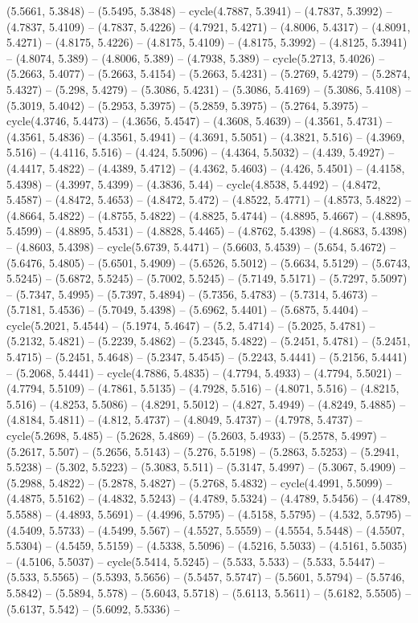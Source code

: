 (5.5661, 5.3848) -- (5.5495, 5.3848) -- cycle(4.7887, 5.3941) -- (4.7837, 5.3992) -- (4.7837, 5.4109) -- (4.7837, 5.4226) -- (4.7921, 5.4271) -- (4.8006, 5.4317) -- (4.8091, 5.4271) -- (4.8175, 5.4226) -- (4.8175, 5.4109) -- (4.8175, 5.3992) -- (4.8125, 5.3941) -- (4.8074, 5.389) -- (4.8006, 5.389) -- (4.7938, 5.389) -- cycle(5.2713, 5.4026) -- (5.2663, 5.4077) -- (5.2663, 5.4154) -- (5.2663, 5.4231) -- (5.2769, 5.4279) -- (5.2874, 5.4327) -- (5.298, 5.4279) -- (5.3086, 5.4231) -- (5.3086, 5.4169) -- (5.3086, 5.4108) -- (5.3019, 5.4042) -- (5.2953, 5.3975) -- (5.2859, 5.3975) -- (5.2764, 5.3975) -- cycle(4.3746, 5.4473) -- (4.3656, 5.4547) -- (4.3608, 5.4639) -- (4.3561, 5.4731) -- (4.3561, 5.4836) -- (4.3561, 5.4941) -- (4.3691, 5.5051) -- (4.3821, 5.516) -- (4.3969, 5.516) -- (4.4116, 5.516) -- (4.424, 5.5096) -- (4.4364, 5.5032) -- (4.439, 5.4927) -- (4.4417, 5.4822) -- (4.4389, 5.4712) -- (4.4362, 5.4603) -- (4.426, 5.4501) -- (4.4158, 5.4398) -- (4.3997, 5.4399) -- (4.3836, 5.44) -- cycle(4.8538, 5.4492) -- (4.8472, 5.4587) -- (4.8472, 5.4653) -- (4.8472, 5.472) -- (4.8522, 5.4771) -- (4.8573, 5.4822) -- (4.8664, 5.4822) -- (4.8755, 5.4822) -- (4.8825, 5.4744) -- (4.8895, 5.4667) -- (4.8895, 5.4599) -- (4.8895, 5.4531) -- (4.8828, 5.4465) -- (4.8762, 5.4398) -- (4.8683, 5.4398) -- (4.8603, 5.4398) -- cycle(5.6739, 5.4471) -- (5.6603, 5.4539) -- (5.654, 5.4672) -- (5.6476, 5.4805) -- (5.6501, 5.4909) -- (5.6526, 5.5012) -- (5.6634, 5.5129) -- (5.6743, 5.5245) -- (5.6872, 5.5245) -- (5.7002, 5.5245) -- (5.7149, 5.5171) -- (5.7297, 5.5097) -- (5.7347, 5.4995) -- (5.7397, 5.4894) -- (5.7356, 5.4783) -- (5.7314, 5.4673) -- (5.7181, 5.4536) -- (5.7049, 5.4398) -- (5.6962, 5.4401) -- (5.6875, 5.4404) -- cycle(5.2021, 5.4544) -- (5.1974, 5.4647) -- (5.2, 5.4714) -- (5.2025, 5.4781) -- (5.2132, 5.4821) -- (5.2239, 5.4862) -- (5.2345, 5.4822) -- (5.2451, 5.4781) -- (5.2451, 5.4715) -- (5.2451, 5.4648) -- (5.2347, 5.4545) -- (5.2243, 5.4441) -- (5.2156, 5.4441) -- (5.2068, 5.4441) -- cycle(4.7886, 5.4835) -- (4.7794, 5.4933) -- (4.7794, 5.5021) -- (4.7794, 5.5109) -- (4.7861, 5.5135) -- (4.7928, 5.516) -- (4.8071, 5.516) -- (4.8215, 5.516) -- (4.8253, 5.5086) -- (4.8291, 5.5012) -- (4.827, 5.4949) -- (4.8249, 5.4885) -- (4.8184, 5.4811) -- (4.812, 5.4737) -- (4.8049, 5.4737) -- (4.7978, 5.4737) -- cycle(5.2698, 5.485) -- (5.2628, 5.4869) -- (5.2603, 5.4933) -- (5.2578, 5.4997) -- (5.2617, 5.507) -- (5.2656, 5.5143) -- (5.276, 5.5198) -- (5.2863, 5.5253) -- (5.2941, 5.5238) -- (5.302, 5.5223) -- (5.3083, 5.511) -- (5.3147, 5.4997) -- (5.3067, 5.4909) -- (5.2988, 5.4822) -- (5.2878, 5.4827) -- (5.2768, 5.4832) -- cycle(4.4991, 5.5099) -- (4.4875, 5.5162) -- (4.4832, 5.5243) -- (4.4789, 5.5324) -- (4.4789, 5.5456) -- (4.4789, 5.5588) -- (4.4893, 5.5691) -- (4.4996, 5.5795) -- (4.5158, 5.5795) -- (4.532, 5.5795) -- (4.5409, 5.5733) -- (4.5499, 5.567) -- (4.5527, 5.5559) -- (4.5554, 5.5448) -- (4.5507, 5.5304) -- (4.5459, 5.5159) -- (4.5338, 5.5096) -- (4.5216, 5.5033) -- (4.5161, 5.5035) -- (4.5106, 5.5037) -- cycle(5.5414, 5.5245) -- (5.533, 5.533) -- (5.533, 5.5447) -- (5.533, 5.5565) -- (5.5393, 5.5656) -- (5.5457, 5.5747) -- (5.5601, 5.5794) -- (5.5746, 5.5842) -- (5.5894, 5.578) -- (5.6043, 5.5718) -- (5.6113, 5.5611) -- (5.6182, 5.5505) -- (5.6137, 5.542) -- (5.6092, 5.5336) -- 